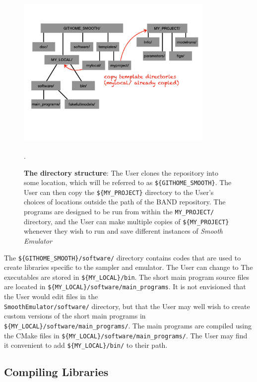 \documentclass[UserManual.tex]{subfiles}
\begin{document}
\begin{figure}
\centerline{\includegraphics[width = 0.85\textwidth]{directorystructure}}
\caption{{\bf The directory structure}: The User clones the repository into some location, which will be referred to as {\tt \$\{GITHOME\_SMOOTH\}}. The User can then copy the {\tt  \$\{MY\_PROJECT\}} directory to the User's choices of locations outside the path of the BAND repository.  The programs are designed to be run from within the {\tt MY\_PROJECT/} directory, and the User can make multiple copies of {\tt  \$\{MY\_PROJECT\}} whenever they wish to run and save different instances of {\it Smooth Emulator}}.
\end{figure}

The {\tt \$\{GITHOME\_SMOOTH\}/software/} directory contains codes that are used to create libraries specific to the sampler and emulator. The User can change to The executables are stored in {\tt \$\{MY\_LOCAL\}/bin}. The short main program source files are located in {\tt \$\{MY\_LOCAL\}/software/main\_programs}. It is not envisioned that the User would edit files in the\\{\tt SmoothEmulator/software/} directory, but that the User may well wish to create custom versions of the short main programs in {\tt \$\{MY\_LOCAL\}/software/main\_programs/}. The main programs are compiled using the CMake files in {\tt \$\{MY\_LOCAL\}/software/main\_programs/}. The User may find it convenient to add {\tt \$\{MY\_LOCAL\}/bin/} to their path.

\subsection{Compiling Libraries }
\end{document}
